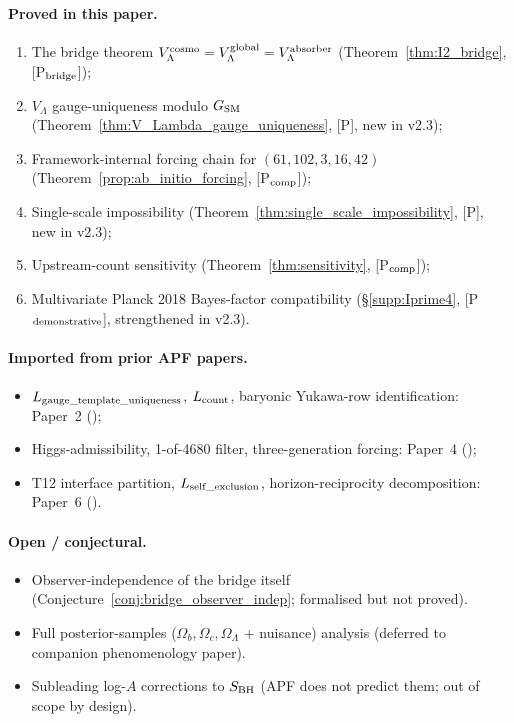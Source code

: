 \documentclass[11pt]{article}
\theoremstyle{plain}
\theoremstyle{definition}
\theoremstyle{remark}
\newcommand{\paperref}[2]{Paper~#1 (\emph{#2})}
\begin{document}
\paragraph{Proved in this paper.}
\begin{enumerate}[leftmargin=2em,itemsep=2pt]
  \item The bridge theorem $V_\Lambda^{\rm cosmo} = V_\Lambda^{\rm global} = V_\Lambda^{\rm absorber}$ (Theorem~\ref{thm:I2_bridge}, [P$_{\rm bridge}$]);
  \item $V_\Lambda$ gauge-uniqueness modulo $G_{\rm SM}$ (Theorem~\ref{thm:V_Lambda_gauge_uniqueness}, [P], new in v2.3);
  \item Framework-internal forcing chain for $(61, 102, 3, 16, 42)$ (Theorem~\ref{prop:ab_initio_forcing}, [P$_{\rm comp}$]);
  \item Single-scale impossibility (Theorem~\ref{thm:single_scale_impossibility}, [P], new in v2.3);
  \item Upstream-count sensitivity (Theorem~\ref{thm:sensitivity}, [P$_{\rm comp}$]);
  \item Multivariate Planck 2018 Bayes-factor compatibility (\S\ref{supp:Iprime4}, [P$_{\rm demonstrative}$], strengthened in v2.3).
\end{enumerate}

\paragraph{Imported from prior APF papers.}
\begin{itemize}[leftmargin=2em,itemsep=2pt]
  \item $L_{\rm gauge\_template\_uniqueness}$, $L_{\rm count}$, baryonic Yukawa-row identification: \paperref{2}{};
  \item Higgs-admissibility, 1-of-4680 filter, three-generation forcing: \paperref{4}{};
  \item T12 interface partition, $L_{\rm self\_exclusion}$, horizon-reciprocity decomposition: \paperref{6}{}.
\end{itemize}

\paragraph{Open / conjectural.}
\begin{itemize}[leftmargin=2em,itemsep=2pt]
  \item Observer-independence of the bridge itself (Conjecture~\ref{conj:bridge_observer_indep}; formalised but not proved).
  \item Full posterior-samples ($\Omega_b, \Omega_c, \Omega_\Lambda$ + nuisance) analysis (deferred to companion phenomenology paper).
  \item Subleading log-$A$ corrections to $S_{\rm BH}$ (APF does not predict them; out of scope by design).
\end{itemize}
\end{document}
